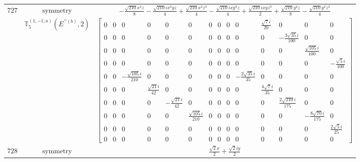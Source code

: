 \documentclass[fleqn,8pt,landscape]{jsarticle}
\begin{document}
\begin{longtable}{ccc}
$ 727 $ & $ \text{symmetry} $ & $ - \frac{\sqrt{210} x^{4} z}{8} - \frac{\sqrt{210} i x^{3} y z}{4} + \frac{\sqrt{210} x^{2} z^{3}}{4} - \frac{\sqrt{210} i x y^{3} z}{4} + \frac{\sqrt{210} i x y z^{3}}{2} + \frac{\sqrt{210} y^{4} z}{8} - \frac{\sqrt{210} y^{2} z^{3}}{4} $ \\
$  $ & $ \mathbb{T}_{5}^{(1,-1;a)}(E^{\prime\prime(b)},2) $ & $ \begin{bmatrix} 0 & 0 & 0 & 0 & 0 & 0 & 0 & 0 & 0 & 0 & \frac{\sqrt{7} i}{20} & 0 & 0 & 0 \\ 0 & 0 & 0 & 0 & 0 & 0 & 0 & 0 & 0 & 0 & 0 & - \frac{3 \sqrt{35} i}{100} & 0 & 0 \\ 0 & 0 & 0 & 0 & 0 & 0 & 0 & 0 & 0 & 0 & 0 & 0 & \frac{\sqrt{105} i}{100} & 0 \\ 0 & 0 & 0 & 0 & 0 & 0 & 0 & 0 & 0 & 0 & 0 & 0 & 0 & - \frac{\sqrt{5} i}{100} \\ 0 & 0 & - \frac{\sqrt{105} i}{210} & 0 & 0 & 0 & 0 & 0 & 0 & - \frac{2 \sqrt{35} i}{35} & 0 & 0 & 0 & 0 \\ 0 & 0 & 0 & \frac{\sqrt{21} i}{42} & 0 & 0 & 0 & 0 & 0 & 0 & \frac{4 \sqrt{7} i}{35} & 0 & 0 & 0 \\ 0 & 0 & 0 & 0 & - \frac{\sqrt{21} i}{42} & 0 & 0 & 0 & 0 & 0 & 0 & \frac{2 \sqrt{210} i}{175} & 0 & 0 \\ 0 & 0 & 0 & 0 & 0 & \frac{\sqrt{105} i}{210} & 0 & 0 & 0 & 0 & 0 & 0 & - \frac{8 \sqrt{70} i}{175} & 0 \\ 0 & 0 & 0 & 0 & 0 & 0 & 0 & 0 & 0 & 0 & 0 & 0 & 0 & \frac{2 \sqrt{5} i}{25} \\ 0 & 0 & 0 & 0 & 0 & 0 & 0 & 0 & 0 & 0 & 0 & 0 & 0 & 0 \end{bmatrix} $ \\ \hline
$ 728 $ & $ \text{symmetry} $ & $ \frac{\sqrt{2} x}{2} + \frac{\sqrt{2} i y}{2} $ \\

\end{longtable}
\end{document}

